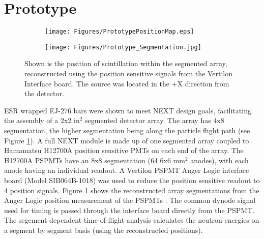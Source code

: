 \section{Prototype} \label{Prototype}

\begin{figure}[ht]
  \begin{subfigure}{0.5\linewidth}
  \texttt{[image: Figures/PrototypePositionMap.eps]}
 \end{subfigure}%
  \begin{subfigure}{0.5\linewidth}
  \texttt{[image: Figures/Prototype\_Segmentation.jpg]}
 \end{subfigure}%
  \caption{Shown is the position of scintillation within the segmented array, reconstructed using the position sensitive signals from the Vertilon Interface board. The source was located in the +X direction from the detector.}
  \label{fig:PSPMTImage}
\end{figure}

ESR wrapped EJ-276 bars were shown to meet NEXT design goals, facilitating the assembly of a 2x2 in$^{2}$ segmented detector array. The array has 4x8 segmentation, the higher segmentation being along the particle flight path (see Figure \ref{fig:PSPMTImage}). A full NEXT module is made up of one segmented array coupled to Hamamatsu H12700A position sensitive PMTs on each end of the array. The H12700A PSPMTs have an 8x8 segmentation (64 6x6 mm$^{2}$ anodes), with each anode having an individual readout. A Vertilon PSPMT Anger Logic interface board (Model SIB064B-1018) was used to reduce the position sensitive readout to 4 position signals. Figure \ref{fig:PSPMTImage} shows the reconstructed array segmentations from the Anger Logic position measurement of the PSPMTs \cite{ANGER}. The common dynode signal used for timing is passed through the interface board directly from the PSPMT. The segement dependent time-of-flight analysis calculates the neutron energies on a segment by segment basis (using the reconstructed positions).

